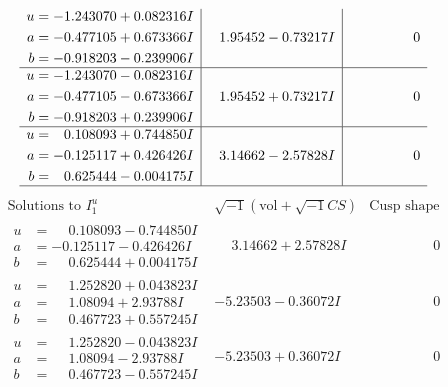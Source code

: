 \documentclass[1p]{elsarticle_modified}
\theoremstyle{definition}
\newcommand{\I}{\sqrt{-1}}
\begin{document}
$$\begin{array}{c|c|c}
\begin{aligned}
u &= -1.243070 + 0.082316 I \\
a &= -0.477105 + 0.673366 I \\
b &= -0.918203 - 0.239906 I\end{aligned}
 & \phantom{-}1.95452 - 0.73217 I & \phantom{-0.000000 } 0 \\ \hline\begin{aligned}
u &= -1.243070 - 0.082316 I \\
a &= -0.477105 - 0.673366 I \\
b &= -0.918203 + 0.239906 I\end{aligned}
 & \phantom{-}1.95452 + 0.73217 I & \phantom{-0.000000 } 0 \\ \hline\begin{aligned}
u &= \phantom{-}0.108093 + 0.744850 I \\
a &= -0.125117 + 0.426426 I \\
b &= \phantom{-}0.625444 - 0.004175 I\end{aligned}
 & \phantom{-}3.14662 - 2.57828 I & \phantom{-0.000000 } 0\\
 \hline 
 \end{array}$$\newpage$$\begin{array}{c|c|c}  
\text{Solutions to }I^u_{1}& \I (\text{vol} + \sqrt{-1}CS) & \text{Cusp shape}\\
 \hline 
\begin{aligned}
u &= \phantom{-}0.108093 - 0.744850 I \\
a &= -0.125117 - 0.426426 I \\
b &= \phantom{-}0.625444 + 0.004175 I\end{aligned}
 & \phantom{-}3.14662 + 2.57828 I & \phantom{-0.000000 } 0 \\ \hline\begin{aligned}
u &= \phantom{-}1.252820 + 0.043823 I \\
a &= \phantom{-}1.08094 + 2.93788 I \\
b &= \phantom{-}0.467723 + 0.557245 I\end{aligned}
 & -5.23503 - 0.36072 I & \phantom{-0.000000 } 0 \\ \hline\begin{aligned}
u &= \phantom{-}1.252820 - 0.043823 I \\
a &= \phantom{-}1.08094 - 2.93788 I \\
b &= \phantom{-}0.467723 - 0.557245 I\end{aligned}
 & -5.23503 + 0.36072 I & \phantom{-0.000000 } 0 \\ \hline\begin{aligned}

\end{aligned}
\end{array}$$
\end{document}
